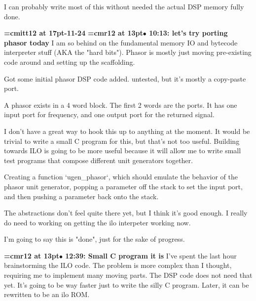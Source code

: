 I can probably write most of this without needed the actual DSP memory fully done.
\par

{\medskip\noindent\bf\font\titlefont=cmitt12 at 17pt-11-24}\medskip
{\smallskip\noindent\bf\font\titlefont=cmr12 at 13pt\titlefont $\bullet$ 10:13: let's try porting phasor today}\smallskip
I am so behind on the fundamental memory IO and bytecode interpreter stuff (AKA the "hard bits"). Phasor is mostly just moving pre-existing code around and setting up the scaffolding.
\par

Got some initial phasor DSP code added. untested, but it's mostly a copy-paste port.
\par

A phasor exists in a 4 word block. The first 2 words are the ports. It has one input port for frequency, and one output port for the returned signal.
\par

I don't have a great way to hook this up to anything at the moment. It would be trivial to write a small C program for this, but that's not too useful. Building towards ILO is going to be more useful because it will allow me to write small test programs that compose different unit generators together.
\par

Creating a function `ugen\_phasor`, which should emulate the behavior of the phasor unit generator, popping a parameter off the stack to set the input port, and then pushing a parameter back onto the stack.
\par

The abstractions don't feel quite there yet, but I think it's good enough. I really do need to working on getting the ilo interpeter working now.
\par

I'm going to say this is "done", just for the sake of progress.
\par

{\smallskip\noindent\bf\font\titlefont=cmr12 at 13pt\titlefont $\bullet$ 12:39: Small C program it is}\smallskip
I've spent the last hour brainstorming the ILO code. The problem is more complex than I thought, requiring me to implement many moving parts. The DSP code does not need that yet. It's going to be way faster just to write the silly C program. Later, it can be rewritten to be an ilo ROM.
\par

